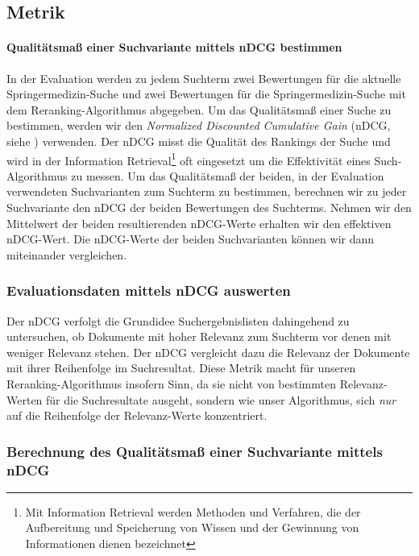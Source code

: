 \subsection{Metrik}
\label{sec:Evaluation:Aufbau:Metrik}

\paragraph{Qualitätsmaß einer Suchvariante mittels nDCG bestimmen}
In der Evaluation werden zu jedem Suchterm zwei Bewertungen für die aktuelle Springermedizin-Suche und zwei Bewertungen für die Springermedizin-Suche mit dem Reranking-Algorithmus abgegeben. Um das Qualitätsmaß einer Suche zu bestimmen, werden wir den \textit{Normalized Discounted Cumulative Gain} (nDCG, siehe \cite{nDCG}) verwenden. Der nDCG misst die Qualität des Rankings der Suche und wird in der Information Retrieval\footnote{Mit Information Retrieval werden Methoden und Verfahren, die der Aufbereitung und Speicherung von Wissen und der Gewinnung von Informationen dienen bezeichnet} oft eingesetzt um die Effektivität eines Such-Algorithmus zu messen.  Um das Qualitätsmaß der beiden, in der Evaluation verwendeten Suchvarianten zum Suchterm zu bestimmen, berechnen wir zu jeder Suchvariante den nDCG der beiden Bewertungen des Suchterms. Nehmen wir den Mittelwert der beiden resultierenden nDCG-Werte erhalten wir den effektiven nDCG-Wert. Die nDCG-Werte der beiden Suchvarianten können wir dann miteinander vergleichen.

\subsubsection{Evaluationsdaten mittels nDCG auswerten}
\label{sec:Evaluation:Aufbau:Metrik:EvaluationsdatennDCG}

Der nDCG verfolgt die Grundidee Suchergebnislisten dahingehend zu untersuchen, ob Dokumente mit hoher Relevanz zum Suchterm vor denen mit weniger Relevanz stehen. Der nDCG vergleicht dazu die Relevanz der Dokumente mit ihrer Reihenfolge im Suchresultat. Diese Metrik macht für unseren Reranking-Algorithmus insofern Sinn, da sie nicht von bestimmten Relevanz-Werten für die Suchresultate ausgeht, sondern wie unser Algorithmus, sich \textit{nur} auf die Reihenfolge der Relevanz-Werte konzentriert. 

\subsubsection{Berechnung des Qualitätsmaß einer Suchvariante mittels nDCG}
\label{sec:Evaluation:Aufbau:Metrik:BerechnungnDCG}

